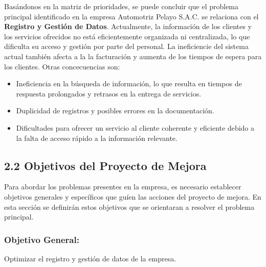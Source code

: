 Basándonos en la matriz de prioridades, se puede concluir que el problema principal identificado en la empresa Automotriz Pelayo S.A.C. se relaciona con el \textbf{Registro y Gestión de Datos}. Actualmente, la información de los clientes y los servicios ofrecidos no está eficientemente organizada ni centralizada, lo que dificulta su acceso y gestión por parte del personal. La ineficiencie del sistema actual también afecta a la la facturación y aumenta de los tiempos de espera para los clientes. Otras concecuencias son:
\begin{itemize}
    \item Ineficiencia en la búsqueda de información, lo que resulta en tiempos de respuesta prolongados y retrasos en la entrega de servicios.
    \item Duplicidad de registros y posibles errores en la documentación.
    \item Dificultades para ofrecer un servicio al cliente coherente y eficiente debido a la falta de acceso rápido a la información relevante.
\end{itemize}



\subsection{2.2 Objetivos del Proyecto de Mejora}
Para abordar los problemas presentes en la empresa, es necesario establecer objetivos generales y específicos que guíen las acciones del proyecto de mejora. En esta sección se definirán estos objetivos que se orientaran a resolver el problema principal.

\subsubsection*{Objetivo General:}
Optimizar el registro y gestión de datos de la empresa.
